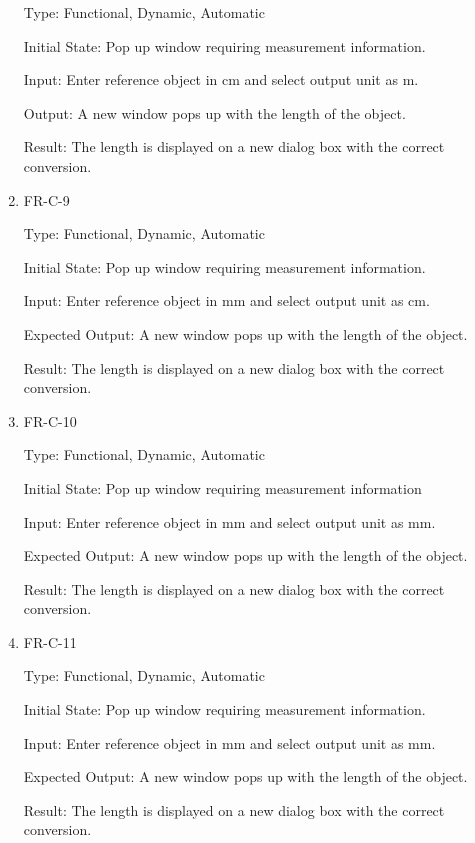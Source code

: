 \documentclass[12pt, titlepage]{article}
\begin{document}
\begin{enumerate}
					Type: Functional, Dynamic, Automatic
					
					Initial State: Pop up window requiring measurement information.
					
					Input: Enter reference object in cm and select output unit as m.
					
					Output: A new window pops up with the length of the object.
					
					Result: The length is displayed on a new dialog box with the correct conversion.
				
				\item{FR-C-9\\}
					
					Type: Functional, Dynamic, Automatic
					
					Initial State: Pop up window requiring measurement information.
					
					Input: Enter reference object in mm and select output unit as cm.
					
					Expected Output: A new window pops up with the length of the object.
					
					Result: The length is displayed on a new dialog box with the correct conversion.
					
				\item{FR-C-10\\}
					
					Type: Functional, Dynamic, Automatic
					
					Initial State: Pop up window requiring measurement information
					
					Input: Enter reference object in mm and select output unit as mm.
					
					Expected Output: A new window pops up with the length of the object.
					
					Result: The length is displayed on a new dialog box with the correct conversion.
				
				\item{FR-C-11\\}
					
					Type: Functional, Dynamic, Automatic
					
					Initial State: Pop up window requiring measurement information.
					
					Input: Enter reference object in mm and select output unit as mm.
					
					Expected Output: A new window pops up with the length of the object.
					
					Result: The length is displayed on a new dialog box with the correct conversion.
					

\end{enumerate}
\end{document}
